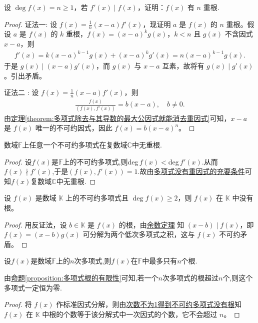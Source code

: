 \documentclass[../../main.tex]{subfiles}
\begin{document}
\begin{proposition}\label{proposition:f有n重根的判断条件}
设 $\deg f(x) = n \geq 1$，若 $f'(x) \mid f(x)$，证明：$f(x)$ 有 $n$ 重根.
\end{proposition}
\begin{proof}
{\color{blue}证法一:}
设 $f(x) = \frac{1}{n}(x - a)f'(x)$，现证明 $a$ 是 $f(x)$ 的 $n$ 重根。假设 $a$ 是 $f(x)$ 的 $k$ 重根，$f(x) = (x - a)^k g(x)$，$k < n$ 且 $g(x)$ 不含因式 $x - a$，则
\begin{align*}
f'(x) = k(x - a)^{k-1}g(x) + (x - a)^k g'(x) = n(x - a)^{k-1}g(x).
\end{align*}
于是 $g(x) \mid (x - a)g'(x)$，而 $g(x)$ 与 $x - a$ 互素，故将有 $g(x) \mid g'(x)$。引出矛盾。

{\color{blue}证法二 :} 设 $f(x) = \frac{1}{n}(x - a)f'(x)$，则
\begin{align*}
\frac{f(x)}{(f(x), f'(x))} = b(x - a), \quad b \neq 0.
\end{align*}
由\hyperref[theorem:多项式除去与其导数的最大公因式就能消去重因式]{定理\ref{theorem:多项式除去与其导数的最大公因式就能消去重因式}}可知，$x - a$ 是 $f(x)$ 唯一的不可约因式，因此 $f(x) = b(x - a)^n$。
\end{proof}

\begin{proposition}
数域$\mathbb{F}$上任意一个不可约多项式在复数域$\mathbb{C}$中无重根.
\end{proposition}
\begin{proof}
设$f(x)$是$\mathbb{F}$上的不可约多项式,则deg$\,f(x)<$deg$\,f'(x)$.从而$f(x)\nmid f'(x)$,于是$(f(x),f'(x))=1$.故由\hyperref[theorem:多项式没有重因式的充要条件]{多项式没有重因式的充要条件}可知$f(x)$复数域$\mathbb{C}$中无重根.
\end{proof}

\begin{lemma}\label{lemma:次数不为1得到不可约多项式没有根}
设 $f(x)$ 是数域 $\mathbb{K}$ 上的不可约多项式且 $\deg f(x) \geq 2$，则 $f(x)$ 在 $\mathbb{K}$ 中没有根。
\end{lemma}
\begin{proof}
用反证法，设 $b \in \mathbb{K}$ 是 $f(x)$ 的根，由\hyperref[theorem:余数定理]{余数定理} 知 $(x - b) \mid f(x)$，即 $f(x) = (x - b)g(x)$ 可分解为两个低次多项式之积，这与 $f(x)$ 不可约矛盾。
\end{proof}

\begin{theorem}[多项式根的有限性]\label{theorem:多项式根的有限性}
设\(f(x)\)是数域\(\mathbb{F}\)上的\(n\)次多项式,则\(f(x)\)在\(\mathbb{F}\)中最多只有\(n\)个根.
\end{theorem}
\begin{note}
由\hyperref[proposition:多项式根的有限性]{命题\ref{proposition:多项式根的有限性}}可知,若一个$n$次多项式的根超过$n$个,则这个多项式一定恒为零.
\end{note}
\begin{proof}
将 $f(x)$ 作标准因式分解，则由\hyperref[lemma:次数不为1得到不可约多项式没有根]{次数不为1得到不可约多项式没有根}知 $f(x)$ 在 $\mathbb{K}$ 中根的个数等于该分解式中一次因式的个数，它不会超过 $n$。
\end{proof}
\end{document}
